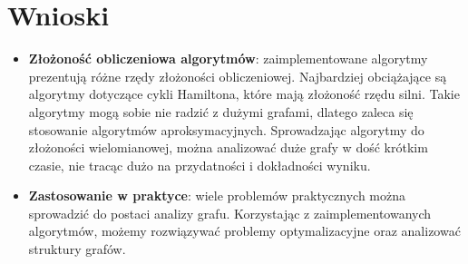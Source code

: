 \section{Wnioski}

\begin{itemize}
    \item \textbf{Złożoność obliczeniowa algorytmów}: zaimplementowane algorytmy prezentują różne rzędy złożoności
        obliczeniowej. Najbardziej obciążające są algorytmy dotyczące cykli Hamiltona, które mają złożoność rzędu silni. Takie algorytmy mogą sobie nie radzić z dużymi grafami, dlatego zaleca się stosowanie algorytmów aproksymacyjnych. Sprowadzając algorytmy do złożoności wielomianowej, można analizować duże grafy w dość krótkim czasie, nie tracąc dużo na przydatności i dokładności wyniku.
    \item \textbf{Zastosowanie w praktyce}: wiele problemów praktycznych można sprowadzić do postaci analizy grafu. Korzystając z zaimplementowanych algorytmów, możemy rozwiązywać problemy optymalizacyjne oraz analizować struktury grafów.
\end{itemize}
